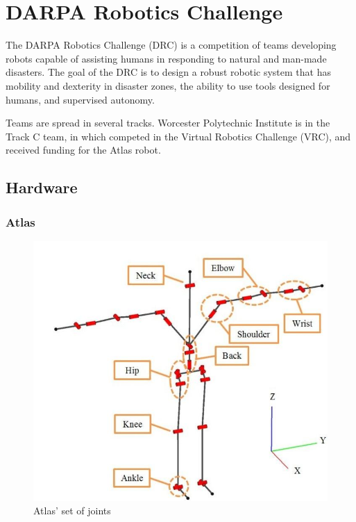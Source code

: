 \documentclass[12pt]{report}
\begin{document}
\chapter{DARPA Robotics Challenge}
 
The DARPA Robotics Challenge (DRC) is a competition of teams developing robots capable of assisting humans in responding to natural and man-made disasters. The goal of the DRC is to design a robust robotic system that has mobility and dexterity in disaster zones, the ability to use tools designed for humans, and supervised autonomy.
 
Teams are spread in several tracks. Worcester Polytechnic Institute is in the Track C team, in which competed in the Virtual Robotics Challenge (VRC), and received funding for the Atlas robot.  

\section{Hardware}
\subsection{Atlas}
\begin{figure}
  \begin{center}
    \includegraphics[scale=0.2]{images/atlas_joints.png}
  \end{center}
  \caption{Atlas' set of joints}
\end{figure}
\end{document}
